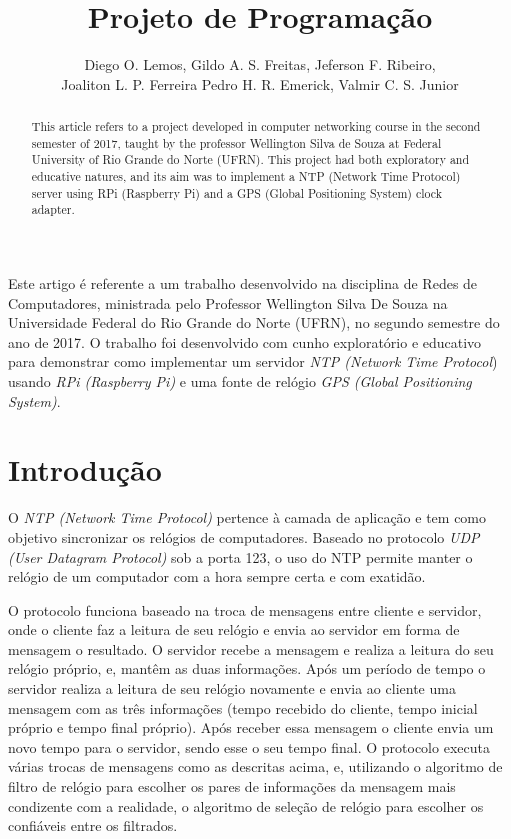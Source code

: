 \documentclass[12pt]{article}
\title{Projeto de Programação}
\author{Diego O. Lemos\inst{1}, Gildo A. S. Freitas\inst{1}, Jeferson F. Ribeiro\inst{1},\\
Joaliton L. P. Ferreira\inst{1} Pedro H. R. Emerick\inst{1}, Valmir C. S. Junior\inst{1} }
\begin{document}
 

\maketitle

\begin{abstract}
This article refers to a project developed in computer networking course in the second semester of 2017, taught by the professor Wellington Silva de Souza at Federal University of Rio Grande do Norte (UFRN). This project had both exploratory and educative natures, and its aim was to implement a NTP (Network Time Protocol) server using RPi (Raspberry Pi) and a GPS (Global Positioning System) clock adapter.
\end{abstract}
     
\begin{resumo} 
Este artigo é referente a um trabalho desenvolvido na disciplina de Redes de Computadores, ministrada pelo Professor Wellington Silva De Souza na Universidade Federal do Rio Grande do Norte (UFRN), no segundo semestre do ano de 2017. O trabalho foi desenvolvido com cunho exploratório e educativo para demonstrar como implementar um servidor \textit{NTP (Network Time Protocol}) usando \textit{RPi (Raspberry Pi)} e uma fonte de relógio \textit{GPS (Global Positioning System)}.
\end{resumo}


\section{Introdução}

O \textit{NTP (Network Time Protocol)} pertence à camada de aplicação e tem como objetivo sincronizar os relógios de computadores. Baseado no protocolo \textit{UDP (User Datagram Protocol)} sob a porta 123, o uso do NTP permite manter o relógio de um computador com a hora sempre certa e com exatidão. 

O protocolo funciona baseado na troca de mensagens entre cliente e servidor, onde o cliente faz a leitura de seu relógio e envia ao servidor em forma de mensagem o resultado. O servidor recebe a mensagem e realiza a leitura do seu relógio próprio, e, mantêm as duas informações.
Após um período de tempo o servidor realiza a leitura de seu relógio novamente e envia ao cliente uma mensagem com as três informações (tempo recebido do cliente, tempo inicial próprio e tempo final próprio). Após receber essa mensagem o cliente envia um novo tempo para o servidor, sendo esse o seu tempo final. O protocolo executa várias trocas de mensagens como as descritas acima, e, utilizando o algoritmo de filtro de relógio para escolher os pares de informações da mensagem mais condizente com a realidade, o algoritmo de seleção de relógio para escolher os confiáveis entre os filtrados.
\end{document}
